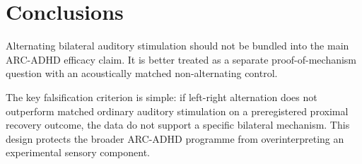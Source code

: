 \section{Conclusions}

Alternating bilateral auditory stimulation should not be bundled into the main ARC-ADHD efficacy claim. It is better treated as a separate proof-of-mechanism question with an acoustically matched non-alternating control.

The key falsification criterion is simple: if left-right alternation does not outperform matched ordinary auditory stimulation on a preregistered proximal recovery outcome, the data do not support a specific bilateral mechanism. This design protects the broader ARC-ADHD programme from overinterpreting an experimental sensory component.
